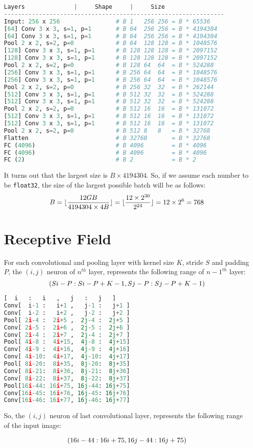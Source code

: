 \documentclass[a4paper]{article}
\DeclarePairedDelimiter\floor{\lfloor}{\rfloor}
\begin{document}
\begin{lstlisting}[language=Python]
            Layers              |     Shape     |     Size
---------------------------------------------------------------
Input: 256 x 256                # B 1   256 256 = B * 65536
[64] Conv 3 x 3, s=1, p=1       # B 64  256 256 = B * 4194304
[64] Conv 3 x 3, s=1, p=1       # B 64  256 256 = B * 4194304
Pool 2 x 2, s=2, p=0            # B 64  128 128 = B * 1048576
[128] Conv 3 x 3, s=1, p=1      # B 128 128 128 = B * 2097152
[128] Conv 3 x 3, s=1, p=1      # B 128 128 128 = B * 2097152
Pool 2 x 2, s=2, p=0            # B 128 64  64  = B * 524288
[256] Conv 3 x 3, s=1, p=1      # B 256 64  64  = B * 1048576
[256] Conv 3 x 3, s=1, p=1      # B 256 64  64  = B * 1048576
Pool 2 x 2, s=2, p=0            # B 256 32  32  = B * 262144
[512] Conv 3 x 3, s=1, p=1      # B 512 32  32  = B * 524288
[512] Conv 3 x 3, s=1, p=1      # B 512 32  32  = B * 524288
Pool 2 x 2, s=2, p=0            # B 512 16  16  = B * 131072
[512] Conv 3 x 3, s=1, p=1      # B 512 16  16  = B * 131072
[512] Conv 3 x 3, s=1, p=1      # B 512 16  16  = B * 131072
Pool 2 x 2, s=2, p=0            # B 512 8   8   = B * 32768
Flatten                         # B 32768       = B * 32768
FC (4096)                       # B 4096        = B * 4096
FC (4096)                       # B 4096        = B * 4096
FC (2)                          # B 2           = B * 2
\end{lstlisting}

It turns out that the largest size is $B \times 4194304$. So, if we assume each number to be \lstinline{float32}, the size of the largest possible batch will be as follows:
$$
B =  \floor{\frac{12 GB}{4194304 \times 4B}} = \floor{\frac{12 \times 2^{30}}{2^{24}}} = 12 \times 2^6 = 768
$$


\section{Receptive Field}

For each convolutional and pooling layer with kernel size $K$, stride $S$ and padding $P$, the $(i, j)$ neuron of $n^{th}$ layer, represents the following range of $n-1^{th}$ layer:
$$(Si - P:Si - P + K - 1, \space Sj - P:Sj - P + K - 1)$$

\begin{lstlisting}[language=Python]
    [  i   :   i   ,   j   :   j   ]
Conv[  i-1 :   i+1 ,   j-1 :   j+1 ]
Conv[  i-2 :   i+2 ,   j-2 :   j+2 ]
Pool[ 2i-4 :  2i+5 ,  2j-4 :  2j+5 ]
Conv[ 2i-5 :  2i+6 ,  2j-5 :  2j+6 ]
Conv[ 2i-4 :  2i+7 ,  2j-4 :  2j+7 ]
Pool[ 4i-8 :  4i+15,  4j-8 :  4j+15]
Conv[ 4i-9 :  4i+16,  4j-9 :  4j+16]
Conv[ 4i-10:  4i+17,  4j-10:  4j+17]
Pool[ 8i-20:  8i+35,  8j-20:  8j+35]
Conv[ 8i-21:  8i+36,  8j-21:  8j+36]
Conv[ 8i-22:  8i+37,  8j-22:  8j+37]
Pool[16i-44: 16i+75, 16j-44: 16j+75]
Conv[16i-45: 16i+76, 16j-45: 16j+76]
Conv[16i-46: 16i+77, 16j-46: 16j+77]
\end{lstlisting}

So, the $(i, j)$ neuron of last convolutional layer, represents the following range of the input image:

$$(16i - 44:16i + 75, \space 16j - 44:16j + 75)$$
\end{document}
